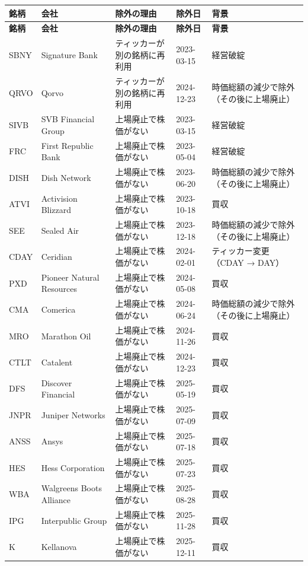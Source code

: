 \documentclass[xelatex,ja=standard,jafont=hiragino-pron,a4paper,10pt]{bxjsreport}
\begin{document}
{\scriptsize
\begin{longtable}{lp{3.60cm}p{4.00cm}lp{3.00cm}}
\toprule
\textbf{銘柄} & \textbf{会社} & \textbf{除外の理由} & \textbf{除外日} & \textbf{背景} \\
\midrule
\endfirsthead
\toprule
\textbf{銘柄} & \textbf{会社} & \textbf{除外の理由} & \textbf{除外日} & \textbf{背景} \\
\midrule
\endhead
\bottomrule
\endfoot
SBNY & Signature Bank & ティッカーが別の銘柄に再利用 & 2023-03-15 & 経営破綻 \\
QRVO & Qorvo & ティッカーが別の銘柄に再利用 & 2024-12-23 & 時価総額の減少で除外（その後に上場廃止） \\
SIVB & SVB Financial Group & 上場廃止で株価がない & 2023-03-15 & 経営破綻 \\
FRC & First Republic Bank & 上場廃止で株価がない & 2023-05-04 & 経営破綻 \\
DISH & Dish Network & 上場廃止で株価がない & 2023-06-20 & 時価総額の減少で除外（その後に上場廃止） \\
ATVI & Activision Blizzard & 上場廃止で株価がない & 2023-10-18 & 買収 \\
SEE & Sealed Air & 上場廃止で株価がない & 2023-12-18 & 時価総額の減少で除外（その後に上場廃止） \\
CDAY & Ceridian & 上場廃止で株価がない & 2024-02-01 & ティッカー変更（CDAY → DAY） \\
PXD & Pioneer Natural Resources & 上場廃止で株価がない & 2024-05-08 & 買収 \\
CMA & Comerica & 上場廃止で株価がない & 2024-06-24 & 時価総額の減少で除外（その後に上場廃止） \\
MRO & Marathon Oil & 上場廃止で株価がない & 2024-11-26 & 買収 \\
CTLT & Catalent & 上場廃止で株価がない & 2024-12-23 & 買収 \\
DFS & Discover Financial & 上場廃止で株価がない & 2025-05-19 & 買収 \\
JNPR & Juniper Networks & 上場廃止で株価がない & 2025-07-09 & 買収 \\
ANSS & Ansys & 上場廃止で株価がない & 2025-07-18 & 買収 \\
HES & Hess Corporation & 上場廃止で株価がない & 2025-07-23 & 買収 \\
WBA & Walgreens Boots Alliance & 上場廃止で株価がない & 2025-08-28 & 買収 \\
IPG & Interpublic Group & 上場廃止で株価がない & 2025-11-28 & 買収 \\
K & Kellanova & 上場廃止で株価がない & 2025-12-11 & 買収 \\

\end{longtable}}
\end{document}
